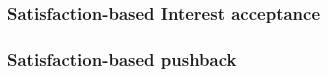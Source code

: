 

 


\subsubsection{\textbf{Satisfaction-based Interest acceptance}}
\label{sec:probabilistic}

 


\subsubsection{\textbf{Satisfaction-based pushback}}
\label{sec:dynamic limits}

 



